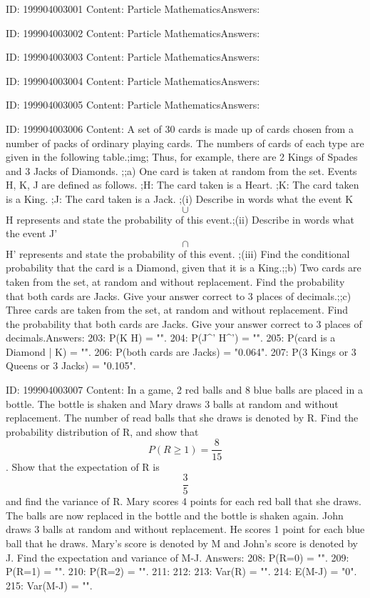 \documentclass{article}
\begin{document}
ID: 199904003001
Content:
Particle MathematicsAnswers:

ID: 199904003002
Content:
Particle MathematicsAnswers:

ID: 199904003003
Content:
Particle MathematicsAnswers:

ID: 199904003004
Content:
Particle MathematicsAnswers:

ID: 199904003005
Content:
Particle MathematicsAnswers:

ID: 199904003006
Content:
A set of 30 cards is made up of cards chosen from a number of packs of ordinary playing cards. The numbers of cards of each type are given in the following table.;img; Thus, for example, there are 2 Kings of Spades and 3 Jacks of Diamonds.  ;;a) One card is taken at random from the set. Events H, K, J are defined as follows. ;H: The card taken is a Heart. ;K: The card taken is a King. ;J: The card taken is a Jack. ;(i) Describe in words what the event K $$\cup$$ H represents and state the probability of this event.;(ii) Describe in words what the event J' $$\cap$$ H' represents and state the probability of this event. ;(iii) Find the conditional probability that the card is a Diamond, given that it is a King.;;b) Two cards are taken from the set, at random and without replacement. Find the probability that both cards are Jacks. Give your answer correct to 3 places of decimals.;;c) Three cards are taken from the set, at random and without replacement. Find the probability that both cards are Jacks. Give your answer correct to 3 places of decimals.Answers:
203: P(K \cup H) = "".
204: P(J^' \cap H^') = "".
205: P(card is a Diamond | K) = "".
206: P(both cards are Jacks) = "0.064".
207: P(3 Kings or 3 Queens or 3 Jacks) = "0.105".

ID: 199904003007
Content:
In a game, 2 red balls and 8 blue balls are placed in a bottle. The bottle is shaken and Mary draws 3 balls at random and without replacement. The number of read balls that she draws is denoted by R. Find the probability distribution of R, and show that $$P(R \geq 1) = \frac{8}{15}$$.  Show that the expectation of R is $$\frac{3}{5}$$ and find the variance of R.  Mary scores 4 points for each red ball that she draws. The balls are now replaced in the bottle and the bottle is shaken again. John draws 3 balls at random and without replacement. He scores 1 point for each blue ball that he draws. Mary's score is denoted by M and John's score is denoted by J. Find the expectation and variance of M-J. Answers:
208: P(R=0) = "".
209: P(R=1) = "".
210: P(R=2) = "".
211: 
212: 
213: Var(R) = "".
214: E(M-J) = "0".
215: Var(M-J) = "".
\end{document}
